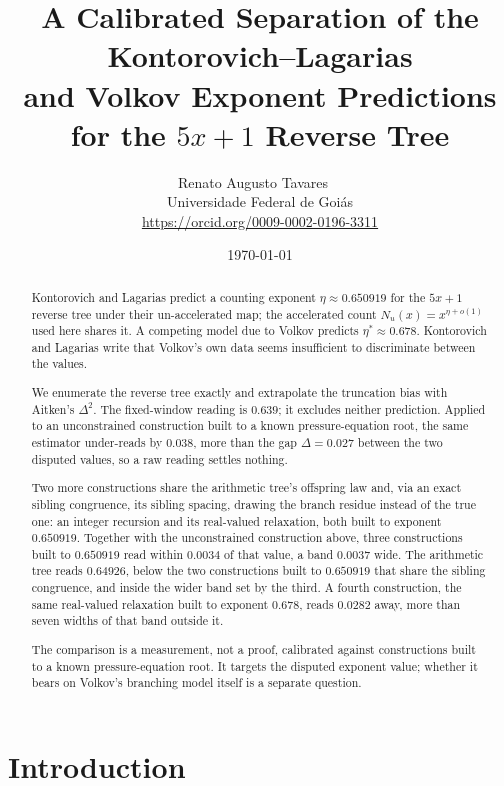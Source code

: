 \documentclass[11pt]{article}
\title{A Calibrated Separation of the Kontorovich--Lagarias\\
and Volkov Exponent Predictions for the $5x+1$ Reverse Tree}
\author{Renato Augusto Tavares~{\small\href{mailto:dr.renatotavares@gmail.com}{\textcolor{black}{\faEnvelope}}}~\orcidlink{0009-0002-0196-3311}\\
\normalsize Universidade Federal de Goiás\\
\small \href{https://orcid.org/0009-0002-0196-3311}{https://orcid.org/0009-0002-0196-3311}}
\date{\today}
\theoremstyle{remark}
\begin{document}
\maketitle

\begin{abstract}
Kontorovich and Lagarias predict a counting exponent $\eta\approx
0.650919$ for the $5x+1$ reverse tree under their un-accelerated map;
the accelerated count $N_u(x)=x^{\eta+o(1)}$ used here shares it. A
competing model due to Volkov predicts $\eta^\ast\approx0.678$.
Kontorovich and Lagarias write that Volkov's own data seems
insufficient to discriminate between the values.

We enumerate the reverse tree exactly and extrapolate the truncation
bias with Aitken's $\Delta^2$. The fixed-window reading is $0.639$; it
excludes neither prediction. Applied to an unconstrained construction
built to a known pressure-equation root, the same estimator under-reads
by $0.038$, more than the gap $\Delta=0.027$ between the two disputed
values, so a raw reading settles nothing.

Two more constructions share the arithmetic tree's offspring law and,
via an exact sibling congruence, its sibling spacing, drawing the
branch residue instead of the true one: an integer recursion and its
real-valued relaxation, both built to exponent $0.650919$. Together
with the unconstrained construction above, three constructions built to
$0.650919$ read within $0.0034$ of that value, a band $0.0037$ wide.
The arithmetic tree reads $0.64926$, below the two constructions built
to $0.650919$ that share the sibling congruence, and inside the wider
band set by the third. A fourth construction, the same real-valued
relaxation built to exponent $0.678$, reads $0.0282$ away, more than
seven widths of that band outside it.

The comparison is a measurement, not a proof, calibrated against
constructions built to a known pressure-equation root. It targets the
disputed exponent value; whether it bears on Volkov's branching model
itself is a separate question.
\end{abstract}

\section{Introduction}
\label{sec:intro}
\end{document}
